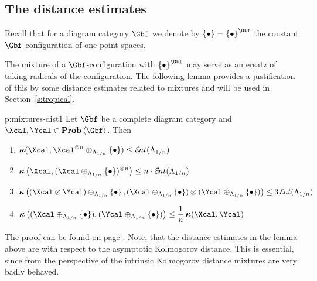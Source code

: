 \subsection{The distance estimates}
  Recall that for a diagram category $\Gbf$ we denote by
  $\set{\bullet}=\set{\bullet}^{\Gbf}$ the constant
  $\Gbf$-configuration of one-point spaces. 
  
  The mixture of a $\Gbf$-configuration with $\set{\bullet}^{\Gbf}$
  may serve as an ersatz of taking radicals of the configuration.  The
  following lemma provides a justification of this by some distance
  estimates related to mixtures and will be used in
  Section~\ref{s:tropical}.

  \begin{lemma}{p:mixtures-dist1}
    Let $\Gbf$ be a complete diagram category and
    $\Xcal,\Ycal\in\prob\<\Gbf>$. Then
    \begin{enumerate}
    \item
      $\displaystyle
      \aikd(\Xcal,\Xcal^{\otimes n}\oplus_{\Lambda_{1/n}}\set{\bullet})
      \leq
      \ent(\Lambda_{1/n})
      $
    \item
      $\displaystyle
      \aikd\big(\Xcal,(\Xcal\oplus_{\Lambda_{1/n}}\set{\bullet})^{\otimes n}\big)
      \leq
      n\cdot\ent(\Lambda_{1/n})
      $
    \item
      $\displaystyle
      \aikd\big(
      (\Xcal\otimes\Ycal)\oplus_{\Lambda_{1/n}}\set{\bullet},
      (\Xcal\oplus_{\Lambda_{1/n}}\set{\bullet})
      \otimes
      (\Ycal\oplus_{\Lambda_{1/n}}\set{\bullet})
      \big)
      \leq
      3\ent(\Lambda_{1/n})
      $
    \item
      $\displaystyle
      \aikd\big((\Xcal\oplus_{\Lambda_{1/n}}\set{\bullet}),
      (\Ycal\oplus_{\Lambda_{1/n}}\set{\bullet})\big)
      \leq
      \frac1n\aikd(\Xcal,\Ycal)
      $
    \end{enumerate}
  \end{lemma}
  
  The proof can be found on page \pageref{p:mixtures-dist1.rep}.  Note,
  that the distance estimates in the lemma above are with respect to
  the asymptotic Kolmogorov distance. This is essential, since from
  the perspective of the intrinsic Kolmogorov distance mixtures are
  very badly behaved.





